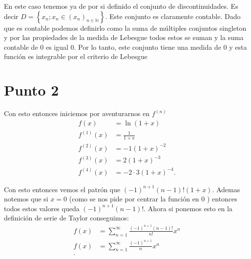 \documentclass{report}
\begin{document}
En este caso tenemos ya de por si definido el conjunto de discontinuidades. Es decir $D = \left\{ x_n ; x_n \in \left( x_n \right)_{n \in \mathbb{N}} \right\} $. Este conjunto es claramente contable. Dado que es contable podemos definirlo como la suma de múltiples conjuntos singleton y por las propiedades de la medida de Lebesgue todos estos se suman y la suma contable de 0 es igual 0. Por lo tanto, este conjunto tiene una medida de $0$ y esta función es integrable por el criterio de Lebesgue

\section{Punto 2}

Con esto entonces iniciemos por aventurarnos en $f^{(n)}$
\begin{align*}
  f\left( x \right) &= \ln\left( 1 + x \right) \\
  f^{(1)}\left( x \right) &= \frac{1}{1 + x} \\
  f^{(2)}\left( x \right) &= -1 \left( 1 + x \right)^{-2} \\
  f^{(3)}\left( x \right) &= 2\left( 1 + x \right)^{-3} \\
  f^{(4)}\left( x \right) &= - 2\cdot 3\left( 1 + x \right)^{-4} 
.\end{align*}

Con esto entonces vemos el patrón que $\left( -1 \right)^{n + 1}\left( n - 1 \right)! \left( 1 + x \right) $. Ademas notemos que si $x = 0$ (como se nos pide por centrar la función en $0$ ) entonces todos estos valores queda $\left( -1 \right)^{n + 1}\left( n - 1 \right)!$. Ahora si ponemos esto en la definición de serie de Taylor conseguimos:
\begin{align*}
  f\left( x \right) &= \sum_{n=1}^{\infty} \frac{\left( -1 \right)^{n + 1}\left( n - 1 \right)!}{n!}x^{n} \\
  f\left( x \right) &= \sum_{n=1}^{\infty} \frac{\left( -1 \right)^{n + 1}}{n}x^{n} \\
.\end{align*}
\end{document}
